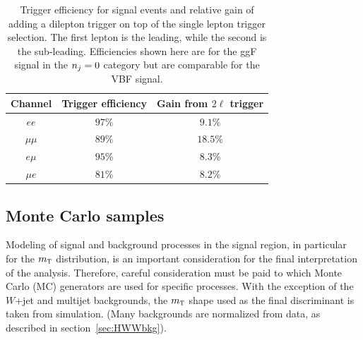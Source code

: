 \begin{table}[h!]
\centering
\captionsetup{justification=centering}

\hspace{-10pt}
\begin{tabular}{|c|c|c|}
\hline
Channel & Trigger efficiency & Gain from $2\ell$ trigger \\ \hline \hline
$ee$ & $97$\% & $9.1$\% \\ \hline
$\mu\mu$ & $89$\% & $18.5$\% \\ \hline
$e\mu$ & $95$\% & $8.3$\% \\ \hline
$\mu e$ & $81$\% & $8.2$\% \\ \hline
\end{tabular}

\caption{
Trigger efficiency for signal events and relative gain of adding a dilepton trigger on top of the single lepton trigger selection. The first lepton is the leading, while the second is the sub-leading. Efficiencies shown here are for the ggF signal in the $n_j = 0$ category but are comparable for the VBF signal. 
}
\label{tab:trigeff}
\end{table}

\subsection{Monte Carlo samples}
\label{sec:HWWMC}

Modeling of signal and background processes in the signal region, in particular for the $m_{\textrm{\footnotesize\sc t}}$ distribution, is an important consideration for the final interpretation of the analysis. Therefore, careful consideration must be paid to which Monte Carlo (MC) generators are used for specific processes. With the exception of the $W$+jet and multijet backgrounds, the $m_{\textrm{\footnotesize\sc t}}$ shape used as the final discriminant is taken from simulation. (Many backgrounds are normalized from data, as described in section~\ref{sec:HWWbkg}).

